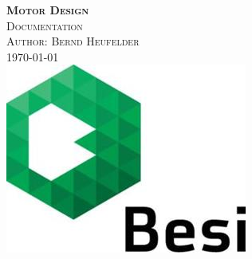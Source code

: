 \documentclass[a4paper, 10pt]{scrartcl}
\begin{document}
	\begin{titlepage}
		\center 		
		\textsc{\huge \bfseries Motor Design}\\[1cm] 
		\textsc{\Large Documentation}\\[0.5cm] 
		\textsc{\large Author: Bernd Heufelder}\\[0.5cm] 
		{\large \today}\\[1cm] 
		\includegraphics[width=0.3\linewidth]{./pics/BesiLogo.jpg}\\[1cm]
		\begin{flushleft}
			\tableofcontents
		\end{flushleft}
	\end{titlepage}

	
	
	
	
\end{document}
